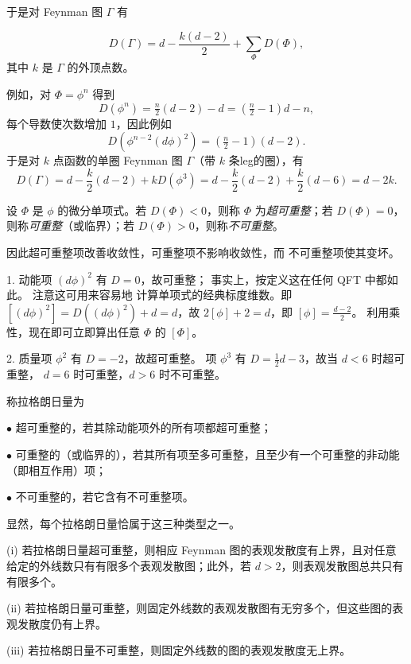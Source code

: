 于是对 Feynman 图 $\Gamma$ 有

\begin{equation}\label{degfo} 
D(\Gamma)=d-\frac{k(d-2)}{2}+\sum_\Phi D(\Phi),
\end{equation}
其中 $k$ 是 $\Gamma$ 的外顶点数。

例如，对 $\Phi=\phi^n$ 得到
$$
D(\phi^n)=\tfrac{n}{2}(d-2)-d=(\tfrac{n}{2}-1)d-n,
$$
每个导数使次数增加 $1$，因此例如
$$
D(\phi^{n-2}(d\phi)^2)=(\tfrac{n}{2}-1)(d-2).
$$
于是对 $k$ 点函数的单圈 Feynman 图 $\Gamma$（带 $k$ 条leg的圈），有
$$
D(\Gamma)=d-\frac{k}{2}(d-2)+kD(\phi^3)=d-\frac{k}{2}(d-2)+\frac{k}{2}(d-6)=d-2k. 
$$

\begin{definition} 设 $\Phi$ 是 $\phi$ 的微分单项式。若
$D(\Phi)<0$，则称 $\Phi$ 为\emph{超可重整}；若 $D(\Phi)=0$，则称\emph{可重整}（或临界）；若
$D(\Phi)>0$，则称\emph{不可重整}。
\end{definition}

因此超可重整项改善收敛性，可重整项不影响收敛性，而
不可重整项使其变坏。

\begin{example} 1. 动能项 $(d\phi)^2$ 有 $D=0$，故可重整；
事实上，按定义这在任何 QFT 中都如此。
注意这可用来容易地
计算单项式的经典标度维数。即
$[(d\phi)^2]=D((d\phi)^2)+d=d$，故
$2[\phi]+2=d$，即 $[\phi]=\frac{d-2}{2}$。
利用乘性，现在即可立即算出任意 $\Phi$ 的 $[\Phi]$。

2. 质量项 $\phi^2$ 有 $D=-2$，故超可重整。
项 $\phi^3$ 有 $D=\frac{1}{2}d-3$，故当 $d<6$ 时超可重整，
$d=6$ 时可重整，$d>6$ 时不可重整。
\end{example}

\begin{definition} 称拉格朗日量为

$\bullet$ 超可重整的，若其除动能项外的所有项都超可重整；

$\bullet$ 可重整的（或临界的），若其所有项至多可重整，且至少有一个可重整的非动能（即相互作用）项；

$\bullet$ 不可重整的，若它含有不可重整项。
\end{definition}

显然，每个拉格朗日量恰属于这三种类型之一。

\begin{proposition} 
(i) 若拉格朗日量超可重整，则相应 Feynman 图的表观发散度有上界，且对任意给定的外线数只有有限多个表观发散图；此外，若 $d>2$，则表观发散图总共只有有限多个。

(ii) 若拉格朗日量可重整，则固定外线数的表观发散图有无穷多个，但这些图的表观发散度仍有上界。

(iii) 若拉格朗日量不可重整，则固定外线数的图的表观发散度无上界。
\end{proposition}

